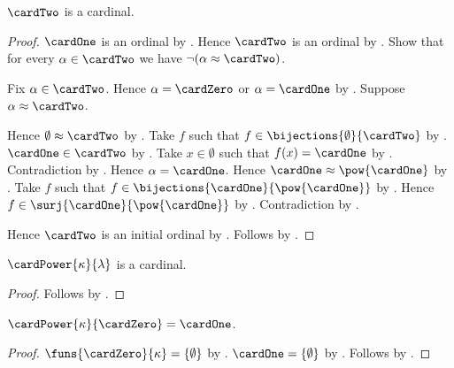 \begin{proposition}\label{cardinal_two_is_cardinal}
    $\cardTwo$ is a cardinal.
\end{proposition}
\begin{proof}
    $\cardOne$ is an ordinal
        by .
    Hence $\cardTwo$ is an ordinal
        by .
    Show that for every $\alpha\in\cardTwo$ we have
        $\lnot(\alpha\approx\cardTwo)$.
    \begin{subproof}
        Fix $\alpha\in\cardTwo$.
        Hence $\alpha=\cardZero$ or $\alpha=\cardOne$
            by .
        Suppose $\alpha\approx\cardTwo$.
        \begin{byCase}
                Hence $\emptyset\approx\cardTwo$
                    by .
                Take $f$ such that
                    $f\in\bijections{\emptyset}{\cardTwo}$
                    by .
                $\cardOne\in\cardTwo$
                    by .
                Take $x\in\emptyset$ such that $f(x)=\cardOne$
                    by .
                Contradiction by .
                Hence $\alpha=\cardOne$.
                Hence $\cardOne\approx\pow{\cardOne}$
                    by .
                Take $f$ such that
                    $f\in\bijections{\cardOne}{\pow{\cardOne}}$
                    by .
                Hence $f\in\surj{\cardOne}{\pow{\cardOne}}$
                    by .
                Contradiction by .
        \end{byCase}
    \end{subproof}
    Hence $\cardTwo$ is an initial ordinal by .
    Follows by .
\end{proof}

\begin{proposition}\label{cardinal_power_is_cardinal}
    $\cardPower{\kappa}{\lambda}$ is a cardinal.
\end{proposition}
\begin{proof}
    Follows by .
\end{proof}

\begin{proposition}\label{cardinal_power_zero}
    $\cardPower{\kappa}{\cardZero}=\cardOne$.
\end{proposition}
\begin{proof}
    $\funs{\cardZero}{\kappa}=\{\emptyset\}$
        by .
    $\cardOne=\{\emptyset\}$
        by .
    Follows by
        .
\end{proof}

